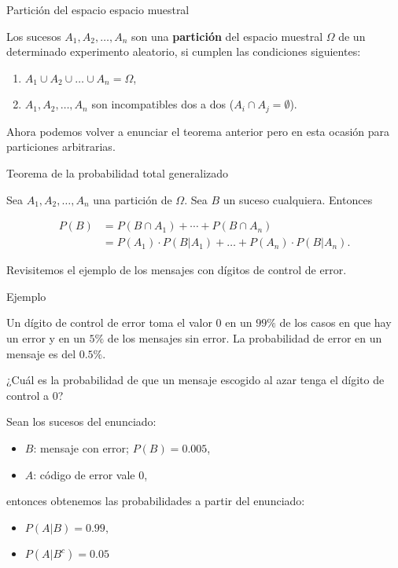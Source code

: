 \documentclass[
  letterpaper,
  DIV=11,
  numbers=noendperiod]{scrreprt}
\providecommand{\tightlist}{%
  \setlength{\itemsep}{0pt}\setlength{\parskip}{0pt}}\usepackage{longtable,booktabs,array}
\begin{document}
Partición del espacio espacio muestral

Los sucesos \(A_1,A_2,\ldots, A_n\) son una \textbf{partición} del
espacio muestral \(\Omega\) de un determinado experimento aleatorio, si
cumplen las condiciones siguientes:

\begin{enumerate}
\def\labelenumi{\arabic{enumi}.}
\tightlist
\item
  \(A_1\cup A_2\cup\ldots\cup A_n=\Omega\),
\item
  \(A_1,A_2,\ldots,A_n\) son incompatibles dos a dos
  (\(A_i\cap A_j=\emptyset\)).
\end{enumerate}

Ahora podemos volver a enunciar el teorema anterior pero en esta ocasión
para particiones arbitrarias.

Teorema de la probabilidad total generalizado

Sea \(A_1,A_2,\ldots,A_n\) una partición de \(\Omega\). Sea \(B\) un
suceso cualquiera. Entonces

\[
\begin{array}{rl}
P(B)&= P(B\cap A_1)+\cdots +P(B\cap A_n)\\
& =P(A_1)\cdot P(B|A_1)+\ldots+P(A_n)\cdot P(B|A_n).
\end{array}
\]

Revisitemos el ejemplo de los mensajes con dígitos de control de error.

Ejemplo

Un dígito de control de error toma el valor 0 en un \(99\%\) de los
casos en que hay un error y en un \(5\%\) de los mensajes sin error. La
probabilidad de error en un mensaje es del \(0.5\%\).

¿Cuál es la probabilidad de que un mensaje escogido al azar tenga el
dígito de control a 0?

Sean los sucesos del enunciado:

\begin{itemize}
\tightlist
\item
  \(B\): mensaje con error; \(P(B)=0.005\),
\item
  \(A\): código de error vale 0,
\end{itemize}

entonces obtenemos las probabilidades a partir del enunciado:

\begin{itemize}
\tightlist
\item
  \(P(A|B)=0.99,\)
\item
  \(P(A|B^c)= 0.05\)
\end{itemize}
\end{document}
